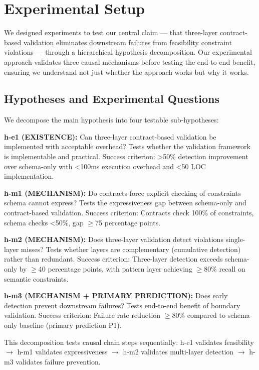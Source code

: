 \section{Experimental Setup}

We designed experiments to test our central claim --- that three-layer contract-based validation eliminates downstream failures from feasibility constraint violations --- through a hierarchical hypothesis decomposition. Our experimental approach validates three causal mechanisms before testing the end-to-end benefit, ensuring we understand not just whether the approach works but why it works.

\subsection{Hypotheses and Experimental Questions}

We decompose the main hypothesis into four testable sub-hypotheses:

\textbf{h-e1 (EXISTENCE):} Can three-layer contract-based validation be implemented with acceptable overhead? Tests whether the validation framework is implementable and practical. Success criterion: >50\% detection improvement over schema-only with <100ms execution overhead and <50 LOC implementation.

\textbf{h-m1 (MECHANISM):} Do contracts force explicit checking of constraints schema cannot express? Tests the expressiveness gap between schema-only and contract-based validation. Success criterion: Contracts check 100\% of constraints, schema checks <50\%, gap $\geq$75 percentage points.

\textbf{h-m2 (MECHANISM):} Does three-layer validation detect violations single-layer misses? Tests whether layers are complementary (cumulative detection) rather than redundant. Success criterion: Three-layer detection exceeds schema-only by $\geq$40 percentage points, with pattern layer achieving $\geq$80\% recall on semantic constraints.

\textbf{h-m3 (MECHANISM + PRIMARY PREDICTION):} Does early detection prevent downstream failures? Tests end-to-end benefit of boundary validation. Success criterion: Failure rate reduction $\geq$80\% compared to schema-only baseline (primary prediction P1).

This decomposition tests causal chain steps sequentially: h-e1 validates feasibility $\rightarrow$ h-m1 validates expressiveness $\rightarrow$ h-m2 validates multi-layer detection $\rightarrow$ h-m3 validates failure prevention.


